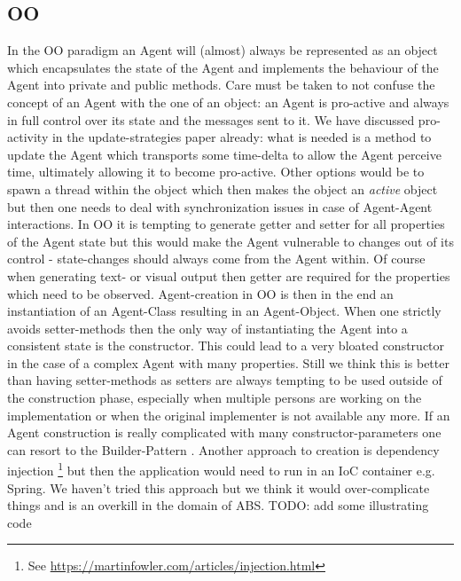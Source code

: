 \subsection{OO}
In the OO paradigm an Agent will (almost) always be represented as an object which encapsulates the state of the Agent and implements the behaviour of the Agent into private and public methods. Care must be taken to not confuse the concept of an Agent with the one of an object: an Agent is pro-active and always in full control over its state and the messages sent to it. We have discussed pro-activity in the update-strategies paper already: what is needed is a method to update the Agent which transports some time-delta to allow the Agent perceive time, ultimately allowing it to become pro-active. Other options would be to spawn a thread within the object which then makes the object an \textit{active} object but then one needs to deal with synchronization issues in case of Agent-Agent interactions. 
In OO it is tempting to generate getter and setter for all properties of the Agent state but this would make the Agent vulnerable to changes out of its control - state-changes should always come from the Agent within. Of course when generating text- or visual output then getter are required for the properties which need to be observed.
Agent-creation in OO is then in the end an instantiation of an Agent-Class resulting in an Agent-Object. When one strictly avoids setter-methods then the only way of instantiating the Agent into a consistent state is the constructor. This could lead to a very bloated constructor in the case of a complex Agent with many properties. Still we think this is better than having setter-methods as setters are always tempting to be used outside of the construction phase, especially when multiple persons are working on the implementation or when the original implementer is not available any more. If an Agent construction is really complicated with many constructor-parameters one can resort to the Builder-Pattern \cite{bloch_effective_2014}. Another approach to creation is dependency injection \footnote{See \url{https://martinfowler.com/articles/injection.html}} but then the application would need to run in an IoC container e.g. Spring. We haven't tried this approach but we think it would over-complicate things and is an overkill in the domain of ABS. TODO: add some illustrating code

